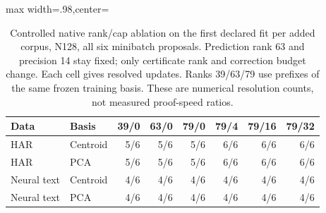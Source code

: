 \begin{table}[tbp]
\centering
\caption{Controlled native rank/cap ablation on the first declared fit per added corpus, N128, all six minibatch proposals. Prediction rank 63 and precision 14 stay fixed; only certificate rank and correction budget change. Each cell gives resolved updates. Ranks 39/63/79 use prefixes of the same frozen training basis. These are numerical resolution counts, not measured proof-speed ratios.}
\label{tab:review-rank-cap}
\begin{adjustbox}{max width=.98\textwidth,center=\textwidth}
\begin{tabular}{llrrrrrr}
\toprule
Data & Basis & 39/0 & 63/0 & 79/0 & 79/4 & 79/16 & 79/32\\
\midrule
HAR & Centroid & 5/6 & 5/6 & 5/6 & 6/6 & 6/6 & 6/6\\
HAR & PCA & 5/6 & 5/6 & 5/6 & 6/6 & 6/6 & 6/6\\
Neural text & Centroid & 4/6 & 4/6 & 4/6 & 4/6 & 4/6 & 4/6\\
Neural text & PCA & 4/6 & 4/6 & 4/6 & 4/6 & 4/6 & 4/6\\
\bottomrule
\end{tabular}
\end{adjustbox}
\end{table}

